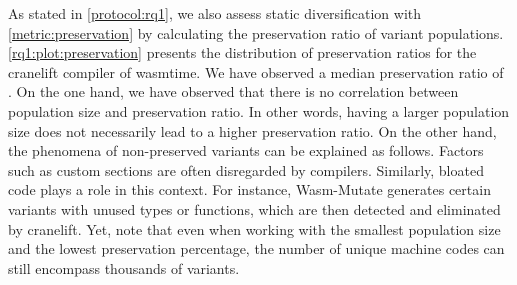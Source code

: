 \documentclass[sigplan,screen]{acmart}
\newcommand*\badge[1]{ \colorbox{red}{\color{white}#1}}
\newcommand{\tool}{{\sc Wasm-Mutate}\xspace}
\newcommand{\wasm}{Wasm\xspace}
\newcommand{\todo}[1]{%
\refstepcounter{todo}
\noindent\textbf{\badge{TODO}} {\color{red}#1}
\addcontentsline{td}{todo}
{\color{red}\thesection.\thetodo\xspace #1}}
\begin{document}
As stated in \autoref{protocol:rq1}, we also assess static diversification with \autoref{metric:preservation} by calculating the preservation ratio of variant populations. 
\autoref{rq1:plot:preservation} presents the distribution of preservation ratios for the cranelift compiler of wasmtime. 
We have observed a median preservation ratio of \preserved. 
On the one hand, we have observed that there is no correlation between population size and preservation ratio. 
In other words, having a larger population size does not necessarily lead to a higher preservation ratio.
On the other hand, the phenomena of non-preserved variants can be explained as follows. 
Factors such as custom sections are often disregarded by compilers. 
Similarly, bloated code plays a role in this context. 
For instance, \tool generates certain variants with unused types or functions, which are then detected and eliminated by cranelift.
Yet, note that even when working with the smallest population size and the lowest preservation percentage, the number of unique machine codes can still encompass thousands of variants.





\end{document}

